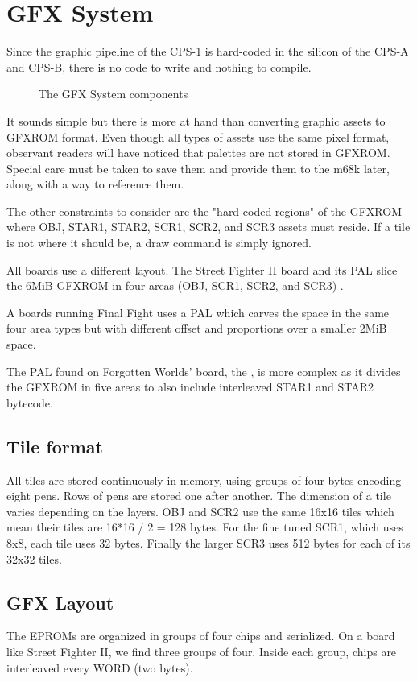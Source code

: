 \chapter{GFX System}
Since the graphic pipeline of the CPS-1 is hard-coded in the silicon of the CPS-A and CPS-B, there is no code to write and nothing to compile. 

\begin{figure}[H]
\caption*{The GFX System components}
\end{figure}

It sounds simple but there is more at hand than converting graphic assets to GFXROM format. Even though all types of assets use the same pixel format, observant readers will have noticed that palettes are not stored in GFXROM. Special care must be taken to save them and provide them to the m68k later, along with a way to reference them.

The other constraints to consider are the "hard-coded regions" of the GFXROM where OBJ, STAR1, STAR2, SCR1, SCR2, and SCR3 assets must reside. If a tile is not where it should be, a draw command is simply ignored.

All boards use a different layout. The Street Fighter II board and its  PAL slice the 6MiB GFXROM in four areas (OBJ, SCR1, SCR2, and SCR3) . 

A boards running Final Fight uses a  PAL which carves the space in the same four area types but with different offset and proportions over a smaller 2MiB space. 

The PAL found on Forgotten Worlds' board, the , is more complex as it divides the GFXROM in five areas to also include interleaved STAR1 and STAR2 bytecode.


\section{Tile format}
All tiles are stored continuously in memory, using groups of four bytes encoding eight pens. Rows of pens are stored one after another. The dimension of a tile varies depending on the layers. OBJ and SCR2 use the same 16x16 tiles which mean their tiles are 16*16 / 2 = 128 bytes. For the fine tuned SCR1, which uses 8x8, each tile uses 32 bytes. Finally the larger SCR3 uses 512 bytes for each of its 32x32 tiles.

\section{GFX Layout}
The EPROMs are organized in groups of four chips and serialized. On a board like Street Fighter II, we find three groups of four. Inside each group, chips are interleaved every WORD (two bytes).

